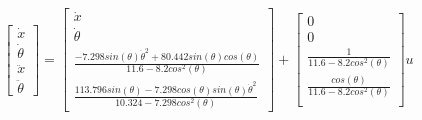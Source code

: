 \documentclass[a4paper,12pt]{article}
\begin{document}
    \begin{equation}
        \begin{bmatrix}
            \dot x\\
            \dot \theta\\
            \ddot x\\
            \ddot \theta    
        \end{bmatrix}
        =
        \begin{bmatrix}
            \dot x\\
            \dot \theta\\
            \frac
            {- 7.298sin(\theta)\dot \theta^2 + 80.442sin(\theta)cos(\theta)}
            {11.6 - 8.2cos^2(\theta)}\\
            \frac
            {113.796sin(\theta) - 7.298cos(\theta)sin(\theta)\dot \theta^2}
            {10.324 - 7.298cos^2(\theta)}
        \end{bmatrix}
        +
        \begin{bmatrix}
            0\\0\\
            \frac{1}
            {11.6 - 8.2cos^2(\theta)}\\
            \frac{cos(\theta)}
            {11.6 - 8.2cos^2(\theta)}\\
        \end{bmatrix}
        u
    \end{equation}
\end{document}
